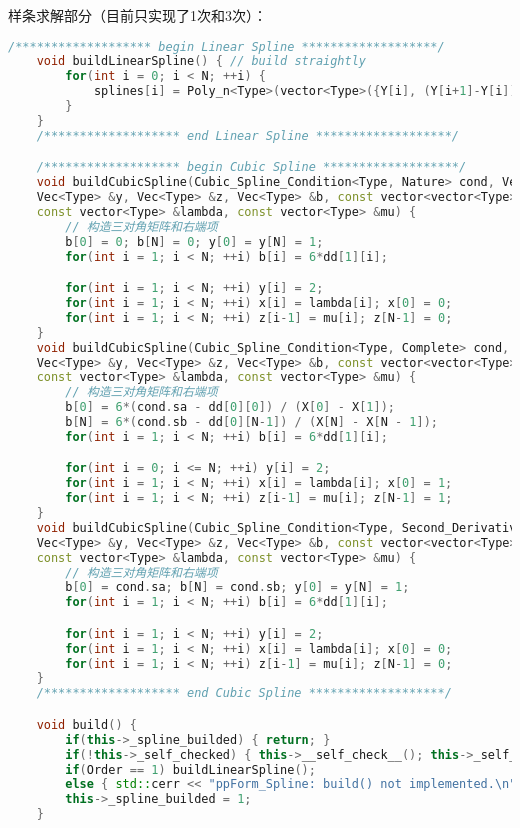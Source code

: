 \documentclass[lang=cn,a4paper,newtx,bibend=bibtex]{elegantpaper}
\begin{document}
样条求解部分（目前只实现了1次和3次）：

\begin{lstlisting}[language = C++]
    /******************* begin Linear Spline *******************/
    void buildLinearSpline() { // build straightly 
        for(int i = 0; i < N; ++i) {
            splines[i] = Poly_n<Type>(vector<Type>({Y[i], (Y[i+1]-Y[i])/(X[i+1]-X[i])}));
        }
    }
    /******************* end Linear Spline *******************/

    /******************* begin Cubic Spline *******************/
    void buildCubicSpline(Cubic_Spline_Condition<Type, Nature> cond, Vec<Type> &x, 
	Vec<Type> &y, Vec<Type> &z, Vec<Type> &b, const vector<vector<Type>>& dd,
	const vector<Type> &lambda, const vector<Type> &mu) {
        // 构造三对角矩阵和右端项
        b[0] = 0; b[N] = 0; y[0] = y[N] = 1;
		for(int i = 1; i < N; ++i) b[i] = 6*dd[1][i];

		for(int i = 1; i < N; ++i) y[i] = 2;
		for(int i = 1; i < N; ++i) x[i] = lambda[i]; x[0] = 0;
		for(int i = 1; i < N; ++i) z[i-1] = mu[i]; z[N-1] = 0;
    }
    void buildCubicSpline(Cubic_Spline_Condition<Type, Complete> cond, Vec<Type> &x, 
	Vec<Type> &y, Vec<Type> &z, Vec<Type> &b, const vector<vector<Type>>& dd,
	const vector<Type> &lambda, const vector<Type> &mu) {
        // 构造三对角矩阵和右端项
        b[0] = 6*(cond.sa - dd[0][0]) / (X[0] - X[1]);
		b[N] = 6*(cond.sb - dd[0][N-1]) / (X[N] - X[N - 1]);
		for(int i = 1; i < N; ++i) b[i] = 6*dd[1][i];

		for(int i = 0; i <= N; ++i) y[i] = 2;
		for(int i = 1; i < N; ++i) x[i] = lambda[i]; x[0] = 1;
		for(int i = 1; i < N; ++i) z[i-1] = mu[i]; z[N-1] = 1;
    }
    void buildCubicSpline(Cubic_Spline_Condition<Type, Second_Derivatives> cond, Vec<Type> &x, 
	Vec<Type> &y, Vec<Type> &z, Vec<Type> &b, const vector<vector<Type>>& dd,
	const vector<Type> &lambda, const vector<Type> &mu) {
        // 构造三对角矩阵和右端项
        b[0] = cond.sa; b[N] = cond.sb; y[0] = y[N] = 1;
		for(int i = 1; i < N; ++i) b[i] = 6*dd[1][i];

		for(int i = 1; i < N; ++i) y[i] = 2;
		for(int i = 1; i < N; ++i) x[i] = lambda[i]; x[0] = 0;
		for(int i = 1; i < N; ++i) z[i-1] = mu[i]; z[N-1] = 0;
    }
    /******************* end Cubic Spline *******************/

    void build() {
        if(this->_spline_builded) { return; }
        if(!this->_self_checked) { this->__self_check__(); this->_self_checked = 1; }
        if(Order == 1) buildLinearSpline();
        else { std::cerr << "ppForm_Spline: build() not implemented.\n"; return; }
        this->_spline_builded = 1;
    }


\end{lstlisting}
\end{document}
